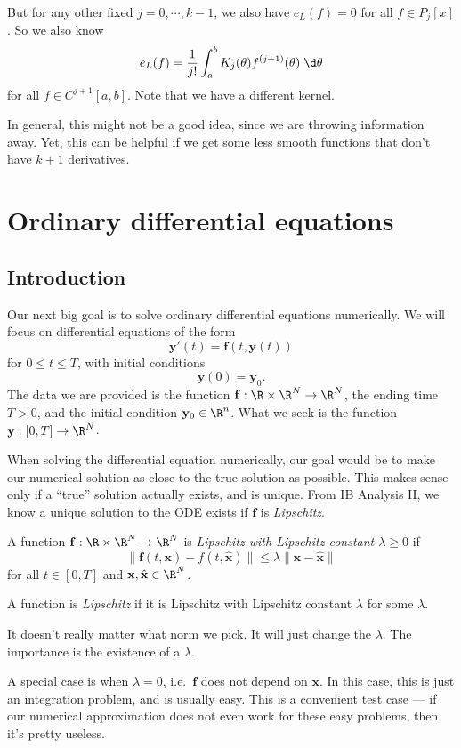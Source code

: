 \documentclass[a4paper]{article}
\begin{document}
But for any other fixed $j = 0, \cdots, k - 1$, we also have $e_L(f) = 0$ for all $f \in P_j[x]$. So we also know
\[
  e_L(f) = \frac{1}{j!} \int_a^b K_j (\theta) f^{(j + 1)}(\theta)\;\d \theta
\]
for all $f \in C^{j + 1}[a, b]$. Note that we have a different kernel.

In general, this might not be a good idea, since we are throwing information away. Yet, this can be helpful if we get some less smooth functions that don't have $k + 1$ derivatives.

\section{Ordinary differential equations}
\subsection{Introduction}
Our next big goal is to solve ordinary differential equations numerically. We will focus on differential equations of the form
\[
  \mathbf{y}'(t) = \mathbf{f}(t, \mathbf{y}(t))
\]
for $0 \leq t \leq T$, with initial conditions
\[
  \mathbf{y}(0) = \mathbf{y}_0.
\]
The data we are provided is the function $\mathbf{f}: \R \times \R^N \to \R^N$, the ending time $T > 0$, and the initial condition $\mathbf{y}_0 \in \R^n$. What we seek is the function $\mathbf{y}: [0, T] \to \R^N$.

When solving the differential equation numerically, our goal would be to make our numerical solution as close to the true solution as possible. This makes sense only if a ``true'' solution actually exists, and is unique. From IB Analysis II, we know a unique solution to the ODE exists if $\mathbf{f}$ is \emph{Lipschitz}.

\begin{defi}
  A function $\mathbf{f}: \R \times \R^N \to \R^N$ is \emph{Lipschitz with Lipschitz constant $\lambda \geq 0$} if
  \[
    \|\mathbf{f}(t, \mathbf{x}) - f(t, \hat{\mathbf{x}})\| \leq \lambda \|\mathbf{x} - \hat{\mathbf{x}}\|
  \]
  for all $t \in [0, T]$ and $\mathbf{x}, \hat{\mathbf{x}} \in \R^N$.

  A function is \emph{Lipschitz} if it is Lipschitz with Lipschitz constant $\lambda$ for some $\lambda$.
\end{defi}
It doesn't really matter what norm we pick. It will just change the $\lambda$. The importance is the existence of a $\lambda$.

A special case is when $\lambda = 0$, i.e.\ $\mathbf{f}$ does not depend on $\mathbf{x}$. In this case, this is just an integration problem, and is usually easy. This is a convenient test case --- if our numerical approximation does not even work for these easy problems, then it's pretty useless.
\end{document}

